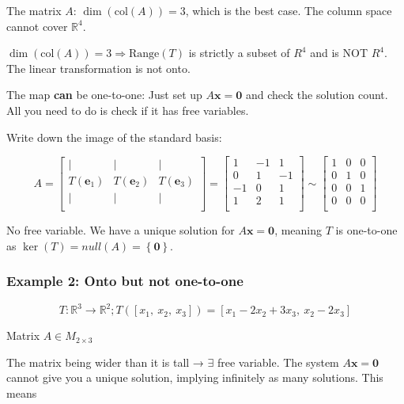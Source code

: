 \documentclass[12pt]{article}
\theoremstyle{plain}
\theoremstyle{remark}
\theoremstyle{definition}
\begin{document}
The matrix \(A\): \(\dim\left( \text{col}(A) \right) = 3\), which is the
best case. The column space cannot cover \(\mathbb{R}^{4}\).

\(\dim\left( \text{col}(A) \right) = 3 \Rightarrow \text{Range}(T)\) is
strictly a subset of \(R^{4}\) and is NOT \(R^{4}\). The linear
transformation is not onto.


The map \textbf{can} be one-to-one: Just set up
\(A\mathbf{x} = \mathbf{0}\) and check the solution count. All
you need to do is check if it has free variables.

Write down the image of the standard basis:

\[A = \begin{bmatrix}
 \mid & \mid & \mid \\
T\left( {\mathbf{e}}_{1} \right) & T\left( {\mathbf{e}}_{2} \right) & T\left( {\mathbf{e}}_{3} \right) \\
 \mid & \mid & \mid \\
\end{bmatrix} = \begin{bmatrix}
1 & - 1 & 1 \\
0 & 1 & - 1 \\
 - 1 & 0 & 1 \\
1 & 2 & 1 \\
\end{bmatrix}\sim\begin{bmatrix}
1 & 0 & 0 \\
0 & 1 & 0 \\
0 & 0 & 1 \\
0 & 0 & 0 \\
\end{bmatrix}\]

No free variable. We have a unique solution for
\(A\mathbf{x} = \mathbf{0}\), meaning \(T\) is one-to-one as
\(\ker(T) = null(A) = \left\{ \mathbf{0} \right\}\).


\subsubsection{Example 2: Onto but not
one-to-one}

\[{T:\mathbb{R}^{3} \rightarrow \mathbb{R}^{2};T\left( \left\lbrack x_{1},\ x_{2},\ x_{3} \right\rbrack \right) }{= \left\lbrack x_{1} - 2x_{2} + 3x_{3},\ x_{2} - 2x_{3} \right\rbrack} \]

Matrix \(A \in M_{2 \times 3}\)


The matrix being wider than it is tall → \(\exists\) free variable. The
system \(A\mathbf{x} = \mathbf{0}\) cannot give you a unique
solution, implying infinitely as many solutions. This means
\end{document}

